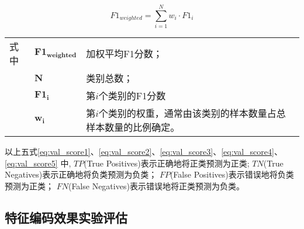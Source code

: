 \begin{equation}
  \label{eq:val_score5}
  F1_{weighted} = \sum\limits_{i=1}^{N} w_i \cdot F1_i
\end{equation}
\begin{flushleft}
  \renewcommand\arraystretch{1.25}
  \begin{tabularx}{\textwidth}{@{}>{\normalsize\rm}l@{\quad}>{\normalsize\rm}l@{——}>{\normalsize\rm}X@{}}
  式中& $\symbf{F1_{weighted}}$ &加权平均F1分数；\\
  &  $\symbf{N}$&类别总数；\\
  &  $\symbf{F1_i}$ &第$i$个类别的F1分数\\
  &  $\symbf{w_i}$ & 第$i$个类别的权重，通常由该类别的样本数量占总样本数量的比例确定。\\
  \end{tabularx}\vspace{.5ex}%
  \end{flushleft}



以上五式\ref{eq:val_score1}、\ref{eq:val_score2}、\ref{eq:val_score3}、\ref{eq:val_score4}、\ref{eq:val_score5}%
中,
  $TP$(True Positives)表示正确地将正类预测为正类;
  $TN$(True Negatives)表示正确地将负类预测为负类；
  $FP$(False Positives)表示错误地将负类预测为正类；
  $FN$(False Negatives)表示错误地将正类预测为负类。

\subsection{特征编码效果实验评估}

